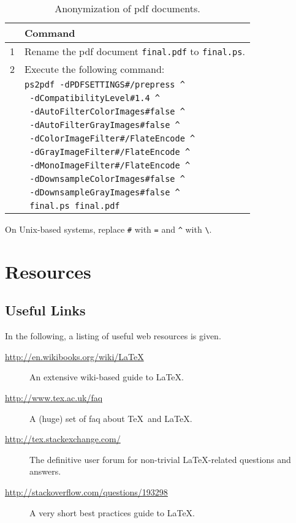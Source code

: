 \begin{table}[h]
  \centering
  \begin{tabular}{rl}
  \toprule
  & Command \\
  \midrule
  1 & Rename the \gls{pdf} document \verb|final.pdf| to \verb|final.ps|. \\
  2 & Execute the following command: \\
    & \verb|ps2pdf -dPDFSETTINGS#/prepress ^| \\
    & \verb| -dCompatibilityLevel#1.4 ^| \\
    & \verb| -dAutoFilterColorImages#false ^| \\
    & \verb| -dAutoFilterGrayImages#false ^| \\
    & \verb| -dColorImageFilter#/FlateEncode ^| \\
    & \verb| -dGrayImageFilter#/FlateEncode ^| \\
    & \verb| -dMonoImageFilter#/FlateEncode ^| \\
    & \verb| -dDownsampleColorImages#false ^| \\
    & \verb| -dDownsampleGrayImages#false ^| \\
    & \verb| final.ps final.pdf| \\
  \bottomrule
  \end{tabular}
  
  On Unix-based systems, replace \verb|#| with \verb|=| and \verb|^| with \verb|\|.
  \caption{Anonymization of \gls{pdf} documents.}
  \label{tab:ps2pdf}
\end{table}

\section{Resources}

\subsection{Useful Links}

In the following, a listing of useful web resources is given.
\begin{description}
\item[\url{http://en.wikibooks.org/wiki/LaTeX}] An extensive wiki-based guide to \LaTeX.
\item[\url{http://www.tex.ac.uk/faq}] A (huge) set of \gls{faq} about \TeX\ and \LaTeX.
\item[\url{http://tex.stackexchange.com/}] The definitive user forum for non-trivial \LaTeX-related questions and answers.
\item[\url{http://stackoverflow.com/questions/193298}] A very short best practices guide to \LaTeX.
\end{description}

